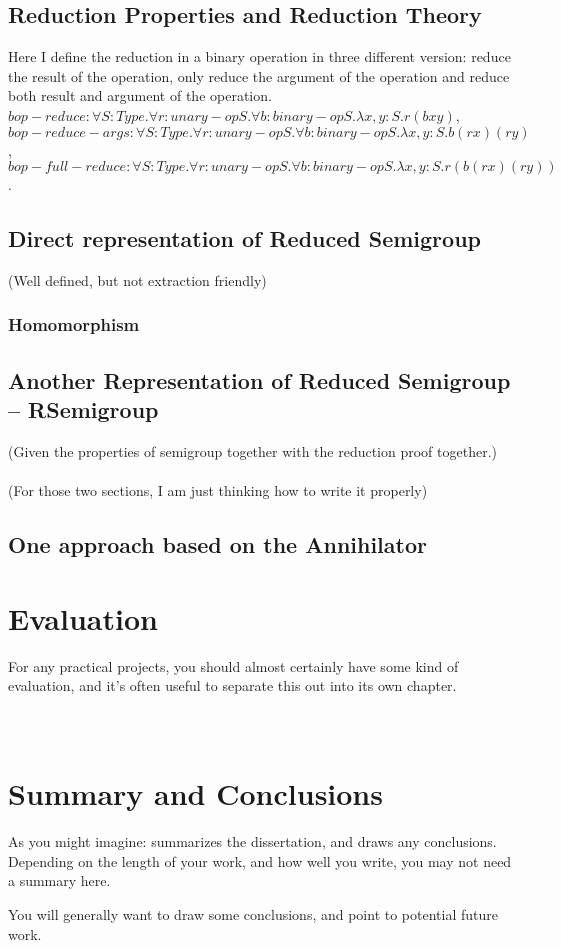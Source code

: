 \documentclass[a4paper,12pt,twoside,openright]{report}
\begin{document}
\section{Reduction Properties and Reduction Theory}
Here I define the reduction in a binary operation in three different version: reduce the result of the operation, only reduce the argument of the operation and reduce both result and argument of the operation. 
$bop-reduce : \forall S:Type. \forall r: unary-op S. \forall b: binary-op S.\lambda x,y:S. r(b x y)$, 
$bop-reduce-args : \forall S:Type. \forall r: unary-op S. \forall b: binary-op S.\lambda x,y:S. b (r x) (r y)$, 
$bop-full-reduce : \forall S:Type. \forall r: unary-op S. \forall b: binary-op S.\lambda x,y:S. r(b (r x) (r y))$.

\section{Direct representation of Reduced Semigroup}
(Well defined, but not extraction friendly)\
\subsection{Homomorphism}
\section{Another Representation of Reduced Semigroup -- RSemigroup}
(Given the properties of semigroup together with the reduction proof together.)\\\\
(For those two sections, I am just thinking how to write it properly)
\section{One approach based on the Annihilator}
\chapter{Evaluation} 

For any practical projects, you should almost certainly have
some kind of evaluation, and it's often useful to separate 
this out into its own chapter. \\\\\\


\chapter{Summary and Conclusions} 

As you might imagine: summarizes the dissertation, and draws 
any conclusions. Depending on the length of your work, and 
how well you write, you may not need a summary here. 

You will generally want to draw some conclusions, and point
to potential future work. 




\appendix
\singlespacing

 

\end{document}
